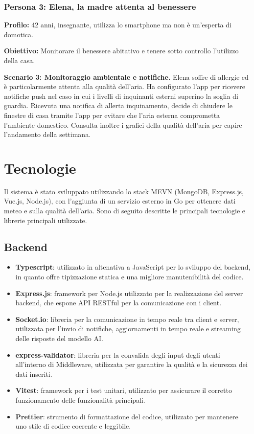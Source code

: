 \documentclass[a4paper,12pt]{article}
\begin{document}
\subsubsection{Persona 3: Elena, la madre attenta al benessere}

\textbf{Profilo:} 42 anni, insegnante, utilizza lo smartphone ma non è un'esperta di domotica.

\noindent\textbf{Obiettivo:} Monitorare il benessere abitativo e tenere sotto controllo l'utilizzo della casa.

\noindent\textbf{Scenario 3: Monitoraggio ambientale e notifiche.} Elena soffre di allergie ed è particolarmente attenta alla qualità dell'aria. Ha configurato l'app per ricevere notifiche push nel caso in cui i livelli di inquinanti esterni superino la soglia di guardia. Ricevuta una notifica di allerta inquinamento, decide di chiudere le finestre di casa tramite l'app per evitare che l'aria esterna comprometta l'ambiente domestico. Consulta inoltre i grafici della qualità dell'aria per capire l'andamento della settimana.
\newpage
\section{Tecnologie}
Il sistema è stato sviluppato utilizzando lo stack MEVN (MongoDB, Express.js, Vue.js, Node.js), con l'aggiunta di un servizio esterno in Go per ottenere dati meteo e sulla qualità dell'aria. Sono di seguito descritte le principali tecnologie e librerie principali utilizzate. 

\subsection{Backend}
\begin{itemize}
    \item \textbf{Typescript}: utilizzato in altenativa a JavaScript per lo sviluppo del backend, in quanto offre tipizzazione statica e una migliore manutenibilità del codice.
    \item \textbf{Express.js}: framework per Node.js utilizzato per la realizzazione del server backend, che espone API RESTful per la comunicazione con i client.
    \item \textbf{Socket.io}: libreria per la comunicazione in tempo reale tra client e server, utilizzata per l'invio di notifiche, aggiornamenti in tempo reale e streaming delle risposte del modello AI.
    \item \textbf{express-validator}: libreria per la convalida degli input degli utenti all'interno di Middleware, utilizzata per garantire la qualità e la sicurezza dei dati inseriti.
    \item \textbf{Vitest}: framework per i test unitari, utilizzato per assicurare il corretto funzionamento delle funzionalità principali.
    \item \textbf{Prettier}: strumento di formattazione del codice, utilizzato per mantenere uno stile di codice coerente e leggibile.
\end{itemize}
\end{document}
